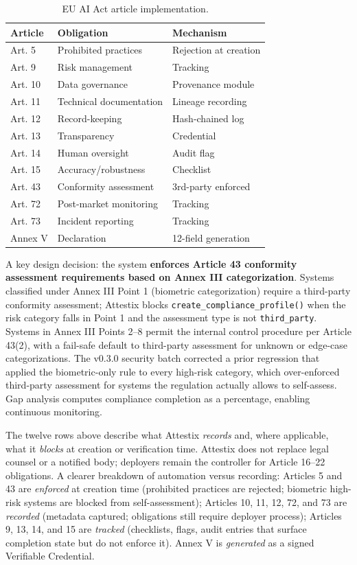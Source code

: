 \documentclass[conference]{IEEEtran}
\begin{document}
\begin{table}[htbp]
\centering
\caption{EU AI Act article implementation.}
\label{tab:compliance}
\begin{tabular}{lll}
\toprule
\textbf{Article} & \textbf{Obligation} & \textbf{Mechanism} \\
\midrule
Art. 5 & Prohibited practices & Rejection at creation \\
Art. 9 & Risk management & Tracking \\
Art. 10 & Data governance & Provenance module \\
Art. 11 & Technical documentation & Lineage recording \\
Art. 12 & Record-keeping & Hash-chained log \\
Art. 13 & Transparency & Credential \\
Art. 14 & Human oversight & Audit flag \\
Art. 15 & Accuracy/robustness & Checklist \\
Art. 43 & Conformity assessment & 3rd-party enforced \\
Art. 72 & Post-market monitoring & Tracking \\
Art. 73 & Incident reporting & Tracking \\
Annex V & Declaration & 12-field generation \\
\bottomrule
\end{tabular}
\end{table}

A key design decision: the system \textbf{enforces Article 43 conformity assessment requirements based on Annex III categorization}. Systems classified under Annex III Point 1 (biometric categorization) require a third-party conformity assessment; Attestix blocks \texttt{create\_compliance\_profile()} when the risk category falls in Point 1 and the assessment type is not \texttt{third\_party}. Systems in Annex III Points 2--8 permit the internal control procedure per Article 43(2), with a fail-safe default to third-party assessment for unknown or edge-case categorizations. The v0.3.0 security batch corrected a prior regression that applied the biometric-only rule to every high-risk category, which over-enforced third-party assessment for systems the regulation actually allows to self-assess. Gap analysis computes compliance completion as a percentage, enabling continuous monitoring.

The twelve rows above describe what Attestix \emph{records} and, where applicable, what it \emph{blocks} at creation or verification time. Attestix does not replace legal counsel or a notified body; deployers remain the controller for Article 16--22 obligations. A clearer breakdown of automation versus recording: Articles 5 and 43 are \emph{enforced} at creation time (prohibited practices are rejected; biometric high-risk systems are blocked from self-assessment); Articles 10, 11, 12, 72, and 73 are \emph{recorded} (metadata captured; obligations still require deployer process); Articles 9, 13, 14, and 15 are \emph{tracked} (checklists, flags, audit entries that surface completion state but do not enforce it). Annex V is \emph{generated} as a signed Verifiable Credential.
\end{document}
